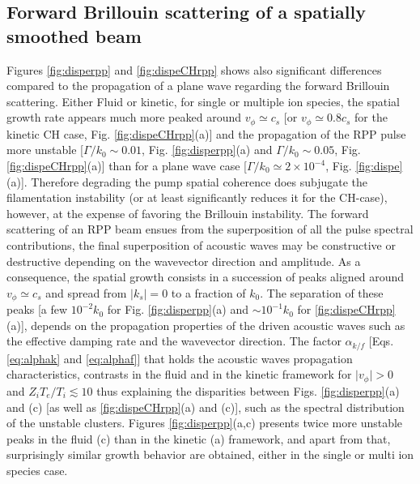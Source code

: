 \documentclass[
 reprint,
 amsmath,amssymb,
 aps,
]{revtex4-1}
\begin{document}
\subsection{Forward Brillouin scattering of a  spatially smoothed beam}
Figures \ref{fig:disperpp} and \ref{fig:dispeCHrpp} shows also significant differences compared to the propagation of a plane wave  regarding the forward Brillouin scattering.  
Either Fluid or kinetic, for single or multiple ion species, 
the spatial growth rate appears much more peaked around $v_\phi\simeq c_s$ [or $v_\phi\simeq 0.8c_s$ for  the kinetic CH case, Fig. \ref{fig:dispeCHrpp}(a)] and the propagation of the RPP pulse more unstable  [$\Gamma/k_0\sim 0.01$, Fig.  \ref{fig:disperpp}(a) and $\Gamma/k_0\sim 0.05$, Fig.  \ref{fig:dispeCHrpp}(a)]  than for a plane wave case  [$\Gamma/k_0\simeq 2 \times 10^{-4}$, Fig.  \ref{fig:dispe}(a)].
Therefore degrading the pump spatial coherence does subjugate the filamentation instability (or at least significantly reduces it for the CH-case), however, at the expense of favoring the Brillouin instability.
The forward scattering of an RPP beam ensues from the superposition of all the pulse spectral contributions, the final superposition of acoustic waves may be constructive or destructive depending on the wavevector direction and amplitude. As a consequence, the spatial growth consists in a succession of peaks aligned around $v_\phi\simeq c_s$ and spread from $\vert k_s\vert=0$ to a fraction of $k_0$. The separation of these peaks [a few $ 10^{-2}k_0$ for Fig. \ref{fig:disperpp}(a) and $\sim 10^{-1}k_0$ for \ref{fig:dispeCHrpp}(a)], depends on the propagation properties of the driven acoustic waves such as the effective damping rate and the wavevector direction. 
The factor $\alpha_{k/f}$ [Eqs. \eqref{eq:alphak} and  \eqref{eq:alphaf}] that  holds the acoustic waves propagation characteristics, contrasts  in the fluid and in the kinetic framework for $\vert v_\phi\vert>0$ and $Z_iT_e/T_i\lesssim 10$ thus explaining the disparities between Figs. \ref{fig:disperpp}(a) and (c) [as well as  \ref{fig:dispeCHrpp}(a) and (c)], such as the spectral distribution of the unstable clusters. 
Figures \ref{fig:disperpp}(a,c) presents twice more unstable peaks in the fluid (c) than in the kinetic (a) framework, and apart from that,  surprisingly similar growth behavior are obtained, either in the single or multi ion species case. 
\end{document}
